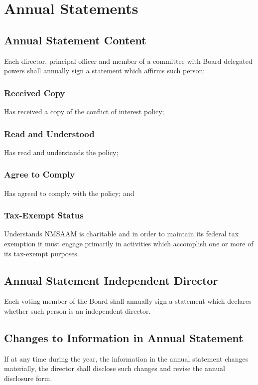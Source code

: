 \documentclass[letterpaper,12pt]{article}
\begin{document}
\section{Annual Statements}
\label{sec:org7ab78f3}

\subsection{Annual Statement Content}
\label{sec:org062dec6}
Each director, principal officer and member of a committee with
Board delegated powers shall annually sign a statement which
affirms such person:

\subsubsection{Received Copy}
\label{sec:org6ab7f51}
Has received a copy of the conflict of interest policy;

\subsubsection{Read and Understood}
\label{sec:orgdfec58a}
Has read and understands the policy;

\subsubsection{Agree to Comply}
\label{sec:orgfaa281d}
Has agreed to comply with the policy; and

\subsubsection{Tax-Exempt Status}
\label{sec:org5ad87f7}
Understands NMSAAM is charitable and in order to maintain its
federal tax exemption it must engage primarily in activities
which accomplish one or more of its tax-exempt purposes.
\subsection{Annual Statement Independent Director}
\label{sec:org3fac931}
Each voting member of the Board shall annually sign a statement
which declares whether such person is an independent director.
\subsection{Changes to Information in Annual Statement}
\label{sec:org28f9957}
If at any time during the year, the information in the annual
statement changes materially, the director shall disclose such
changes and revise the annual disclosure form.
\end{document}
